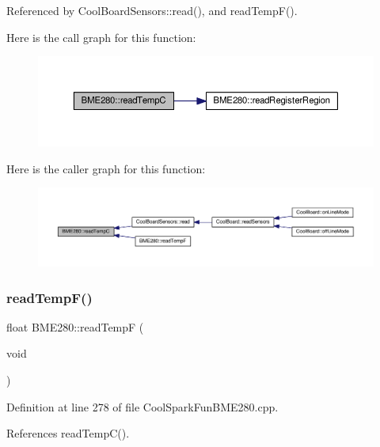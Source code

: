 Referenced by Cool\+Board\+Sensors\+::read(), and read\+Temp\+F().

Here is the call graph for this function\+:
\nopagebreak
\begin{figure}[H]
\begin{center}
\leavevmode
\includegraphics[width=350pt]{df/dcf/class_b_m_e280_afffdd1d7ded9e1f92200e70669019d97_cgraph}
\end{center}
\end{figure}
Here is the caller graph for this function\+:\nopagebreak
\begin{figure}[H]
\begin{center}
\leavevmode
\includegraphics[width=350pt]{df/dcf/class_b_m_e280_afffdd1d7ded9e1f92200e70669019d97_icgraph}
\end{center}
\end{figure}
\mbox{\label{class_b_m_e280_a9648b496f6b4700550782a715a98b3c7}} 
\subsubsection{\texorpdfstring{read\+Temp\+F()}{readTempF()}}
{\footnotesize\ttfamily float B\+M\+E280\+::read\+TempF (\begin{DoxyParamCaption}\item[{void}]{ }\end{DoxyParamCaption})}



Definition at line 278 of file Cool\+Spark\+Fun\+B\+M\+E280.\+cpp.



References read\+Temp\+C().

